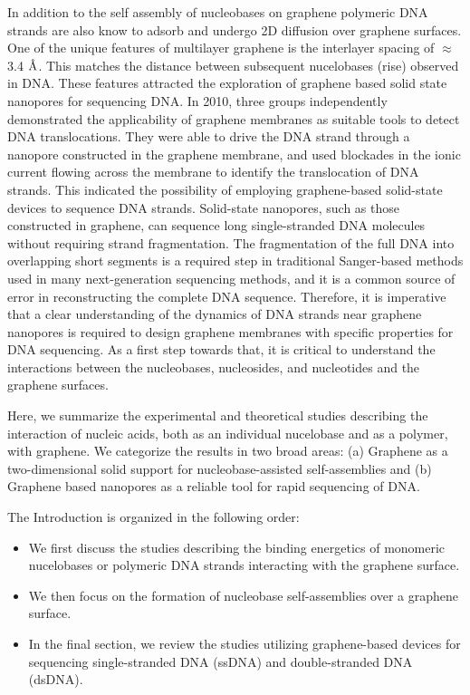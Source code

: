 In addition to the self assembly of nucleobases on graphene polymeric DNA strands are also know to adsorb and undergo 2D diffusion over graphene surfaces.\supercite{hampitak_protein_2020,wei_control_2019,he_planar_2020,shankla_step-defect_2019,shankla_conformational_2014,wells_assessing_2012} One of the unique features of multilayer graphene is the interlayer spacing of $\approx$ 3.4 $\text{\normalfont\AA}$. This matches the distance between subsequent nucelobases (rise) observed in DNA. These features attracted the exploration of graphene based solid state nanopores for sequencing DNA. In 2010, three groups independently demonstrated the applicability of graphene membranes as suitable tools to detect DNA translocations.\supercite{merchant_dna_2010,schneider_dna_2010,garaj_graphene_2010} They were able to drive the DNA strand through a nanopore constructed in the graphene membrane, and used blockades in the ionic current flowing across the membrane to identify the translocation of DNA strands. This indicated the possibility of employing graphene-based solid-state devices to sequence DNA strands. Solid-state nanopores, such as those constructed in graphene, can sequence long single-stranded DNA molecules without requiring strand fragmentation.\supercite{merchant_dna_2010,schneider_dna_2010,garaj_graphene_2010,li_dna_2003,yuan_solid-state_2018,xue_solid-state_2020} The fragmentation of the full DNA into overlapping short segments is a required step in traditional Sanger-based methods used in many next-generation sequencing methods, and it is a common source of error in reconstructing the complete DNA sequence.\supercite{sanger_dna_1977,daniels_sanger_2021,curci_how_2015} Therefore, it is imperative that a clear understanding of the dynamics of DNA strands near graphene nanopores is required to design graphene membranes with specific properties for DNA sequencing.\supercite{schneider_tailoring_2013} As a first step towards that, it is critical to understand the interactions between the nucleobases, nucleosides, and nucleotides and the graphene surfaces.

Here, we summarize the experimental and theoretical studies describing the interaction of nucleic acids, both as an individual nucelobase and as a polymer, with graphene. We categorize the results in two broad areas: (a) Graphene as a two-dimensional solid support for nucleobase-assisted self-assemblies and (b) Graphene based nanopores as a reliable tool for rapid sequencing of DNA. 

The Introduction is organized in the following order:
\begin{itemize}
    \item We first discuss the studies describing the binding energetics of monomeric nucelobases or polymeric DNA strands interacting with the graphene surface.
    \item We then focus on the formation of nucleobase self-assemblies over a graphene surface.
    \item In the final section, we review the studies utilizing graphene-based devices for sequencing single-stranded DNA (ssDNA) and double-stranded DNA (dsDNA).
\end{itemize} 

